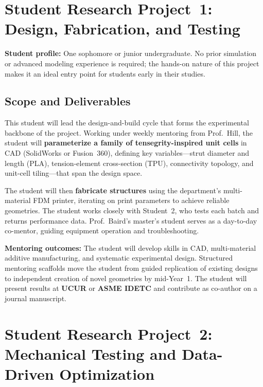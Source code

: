 \documentclass[11pt]{article}
\begin{document}
\section{Student Research Project~1: Design, Fabrication, and Testing}

\textbf{Student profile:} One sophomore or junior undergraduate.  No prior
simulation or advanced modeling experience is required; the hands-on nature of
this project makes it an ideal entry point for students early in their studies.

\subsection*{Scope and Deliverables}

This student will lead the design-and-build cycle that forms the experimental
backbone of the project.  Working under weekly mentoring from
Prof.~Hill, the student will \textbf{parameterize a family of
tensegrity-inspired unit cells} in CAD (SolidWorks or Fusion~360), defining key
variables---strut diameter and length (PLA), tension-element cross-section
(TPU), connectivity topology, and unit-cell tiling---that span the design space.

The student will then \textbf{fabricate structures} using the department's
multi-material FDM printer, iterating on print parameters
to achieve reliable geometries.
The student works closely with Student~2, who tests each
batch and returns performance data.
Prof.~Baird's master's student serves as a day-to-day co-mentor,
guiding equipment operation and troubleshooting.

\textbf{Mentoring outcomes:} The student will develop skills in CAD,
multi-material additive manufacturing, and systematic experimental design.
Structured mentoring scaffolds move the student from guided replication of
existing designs to independent creation of novel geometries by mid-Year~1.
The student will present results at \textbf{UCUR} or \textbf{ASME IDETC} and
contribute as co-author on a journal manuscript.

\section{Student Research Project~2: Mechanical Testing and Data-Driven Optimization}
\end{document}
